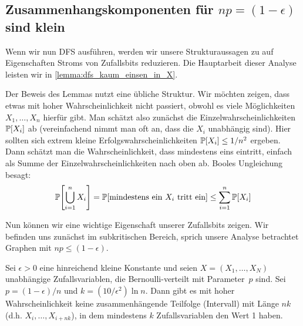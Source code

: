 \subsection{Zusammenhangskomponenten für $np = (1-\epsilon)$ sind klein}
Wenn wir nun DFS ausführen, werden wir unsere Strukturaussagen zu \Gnp auf Eigenschaften Stroms von Zufallsbits reduzieren.
Die Hauptarbeit dieser Analyse leisten wir in \cref{lemma:dfs_kaum_einsen_in_X}.

Der  Beweis des Lemmas nutzt eine übliche Struktur.
Wir möchten zeigen, dass etwas mit hoher Wahrscheinlichkeit nicht passiert, obwohl es viele Möglichkeiten $X_1, \ldots, X_n$ hierfür gibt.
Man schätzt also zunächst die Einzelwahrscheinlichkeiten~$\mathbb{P}\!\left[X_i\right]$ ab (vereinfachend nimmt man oft an, dass die $X_i$ unabhängig sind).
Hier sollten sich extrem kleine Erfolgswahrscheinlichkeiten $\mathbb{P}\!\left[X_i\right] \le 1/n^2$ ergeben.
Dann schätzt man die Wahrscheinlichkeit, dass mindestens eins eintritt, einfach als Summe der Einzelwahrscheinlichkeiten nach oben ab.
Booles  Ungleichung besagt:
\begin{equation}
    \mathbb{P}\!\left[\bigcup_{i=1}^n X_i\right] = \mathbb{P}\!\left[\text{mindestens ein $X_i$ tritt ein}\right] \le \sum_{i=1}^n \mathbb{P}\!\left[X_i\right]
\end{equation}

\noindent
Nun können wir eine wichtige Eigenschaft unserer Zufallsbits zeigen.
Wir befinden uns zunächst im subkritischen Bereich, sprich unsere Analyse betrachtet Graphen mit $np \le (1 - \epsilon)$.

\begin{lemma}\label{lemma:dfs_kaum_einsen_in_X}
    Sei $\epsilon > 0$  eine hinreichend kleine Konstante und seien $X = (X_1, \ldots, X_N)$ unabhängige Zufallsvariablen, die Bernoulli-verteilt mit Parameter~$p$ sind.
    Sei $p = (1 - \epsilon) / n$ und $k = (10 / \epsilon^2) \ln n$.
    Dann gibt es mit hoher Wahrscheinlichkeit keine zusammenhängende Teilfolge (Intervall) mit Länge $nk$ (d.h. $X_i, \ldots, X_{i+nk}$), in dem mindestens $k$ Zufallsvariablen den Wert 1 haben.
\end{lemma}


